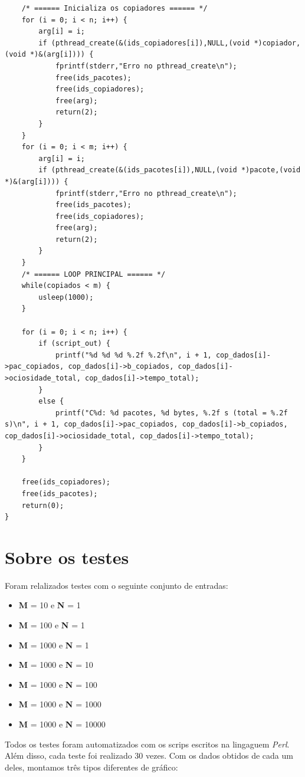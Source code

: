 \documentclass[12pt,a4paper]{article}
\begin{document}
\begin{lstlisting}
	/* ====== Inicializa os copiadores ====== */
	for (i = 0; i < n; i++) {
		arg[i] = i;
		if (pthread_create(&(ids_copiadores[i]),NULL,(void *)copiador,(void *)&(arg[i]))) {
			fprintf(stderr,"Erro no pthread_create\n");
			free(ids_pacotes);
			free(ids_copiadores);
			free(arg);
			return(2);
		}
	}
	for (i = 0; i < m; i++) {
		arg[i] = i;
		if (pthread_create(&(ids_pacotes[i]),NULL,(void *)pacote,(void *)&(arg[i]))) {
			fprintf(stderr,"Erro no pthread_create\n");
			free(ids_pacotes);
			free(ids_copiadores);
			free(arg);
			return(2);
		}
	}
	/* ====== LOOP PRINCIPAL ====== */
	while(copiados < m) {
		usleep(1000);
	}

	for (i = 0; i < n; i++) {
		if (script_out) {
			printf("%d %d %d %.2f %.2f\n", i + 1, cop_dados[i]->pac_copiados, cop_dados[i]->b_copiados, cop_dados[i]->ociosidade_total, cop_dados[i]->tempo_total);
		}
		else {
			printf("C%d: %d pacotes, %d bytes, %.2f s (total = %.2f s)\n", i + 1, cop_dados[i]->pac_copiados, cop_dados[i]->b_copiados, cop_dados[i]->ociosidade_total, cop_dados[i]->tempo_total);
		}
	}

	free(ids_copiadores);
	free(ids_pacotes);
	return(0);
}

\end{lstlisting}
\pagebreak

\section{Sobre os testes}

Foram relalizados testes com o seguinte conjunto de entradas:
\\
\begin{itemize}
	\item \textbf{M} = 10 e \textbf{N} = 1
	\item \textbf{M} = 100 e \textbf{N} = 1
	\item \textbf{M} = 1000 e \textbf{N} = 1
	\item \textbf{M} = 1000 e \textbf{N} = 10
	\item \textbf{M} = 1000 e \textbf{N} = 100
	\item \textbf{M} = 1000 e \textbf{N} = 1000
	\item \textbf{M} = 1000 e \textbf{N} = 10000
\end{itemize}

\pagebreak
Todos os testes foram automatizados com os scrips escritos na lingaguem \textit{Perl}. Além disso, cada teste foi realizado 30 vezes. 
Com os dados obtidos de cada um deles, montamos três tipos diferentes de gráfico:
\end{document}
